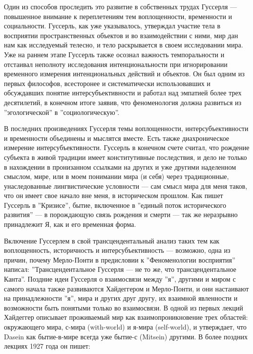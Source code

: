 \documentclass[11pt]{book}
\begin{document}
Один из способов проследить это развитие в собственных трудах Гуссерля --- повышенное внимание к переплетениям тем воплощенности, временности и социальности. Гуссерль, как уже указывалось, утверждал участие тела в восприятии пространственных объектов и во взаимодействии с ними, мир дан нам как исследуемый телесно, и тело раскрывается в своем исследовании мира. Уже на раннем этапе Гуссерль также осознал важность темпоральности и отстаивал неполноту исследования интенциональности при игнорировании временного измерения интенциональных действий и объектов. Он был одним из первых философов, всесторонее и систематически использовавших и обсуждавших понятие интерсубъективности и работал над эмпатией более трех десятилетий, в конечном итоге заявив, что феноменология должна развиться из ''эгологической'' в ''социологическую''.

В последних произведениях Гуссерля темы воплощенности, интерсубъективности и временности объединены и мыслятся вместе. Есть также диахроническое измерение интерсубъективности. Гуссерль в конечном счете считал, что рождение субъекта в живой традиции имеет конститутивные последствия, и дело не только в нахождении в пронизанном ссылками на других и уже другими наделенном смыслом, мире, или в моем понимании мира (и себя) через традиционные, унаследованные лингвистические условности --- сам смысл мира для меня таков, что он имеет свое начало вне меня, в историческом прошлом. Как пишет Гуссерль в ''Кризисе'', бытие, включенное в ''единый поток исторического развития'' --- в порождающую связь рождения и смерти --- так же неразрывно принадлежит Я, как и его временная форма.

Включение Гуссерлем в свой трансцендентальный анализ таких тем как воплощенность, историчность и интерсубъективность --- возможно, одна из причин, почему Мерло-Понти в предисловии к ''Феноменологии восприятия'' написал: ''Трансцендентальное Гуссерля --- не то же, что трансцендентальное Канта''. Поздние идеи Гуссерля о взаимосвязи между ''я'', другими и миром с самого начала также развиваются Хайдеггером и Мерло-Понти, и они настаивают на принадлежности ''я'', мира и других друг другу, их взаимной явленности и возможности быть понятыми только во взаимосвязи. В одной из первых лекций Хайдеггер описывает проживаемый мир как взаимопроникновение трех областей: окружающего мира, с-мира (with-world) и я-мира (self-world), и утверждает, что Dasein как бытие-в-мире всегда уже бытие-с (Mitsein) другими. В более поздних лекциях 1927 года он пишет:

\smallskip
{}\relax
{}\relax
\end{document}
